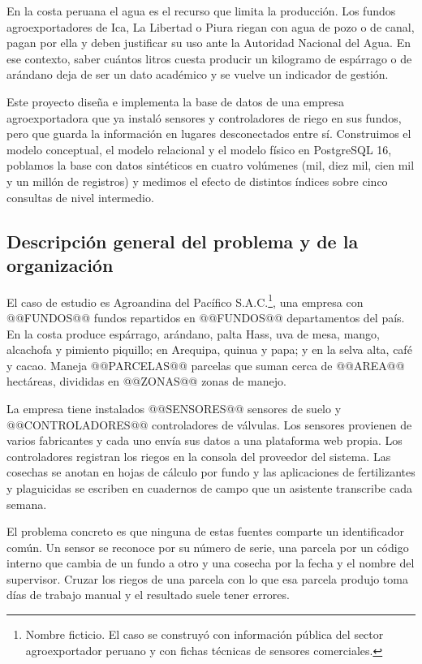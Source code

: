 \documentclass[11pt,letterpaper]{article}
\begin{document}
En la costa peruana el agua es el recurso que limita la producción. Los fundos agroexportadores de Ica, La Libertad o Piura riegan con agua de pozo o de canal, pagan por ella y deben justificar su uso ante la Autoridad Nacional del Agua. En ese contexto, saber cuántos litros cuesta producir un kilogramo de espárrago o de arándano deja de ser un dato académico y se vuelve un indicador de gestión.

Este proyecto diseña e implementa la base de datos de una empresa agroexportadora que ya instaló sensores y controladores de riego en sus fundos, pero que guarda la información en lugares desconectados entre sí. Construimos el modelo conceptual, el modelo relacional y el modelo físico en PostgreSQL 16, poblamos la base con datos sintéticos en cuatro volúmenes (mil, diez mil, cien mil y un millón de registros) y medimos el efecto de distintos índices sobre cinco consultas de nivel intermedio.

\subsection{Descripción general del problema y de la organización}

El caso de estudio es Agroandina del Pacífico S.A.C.\footnote{Nombre ficticio. El caso se construyó con información pública del sector agroexportador peruano y con fichas técnicas de sensores comerciales.}, una empresa con @@FUNDOS@@ fundos repartidos en @@FUNDOS@@ departamentos del país. En la costa produce espárrago, arándano, palta Hass, uva de mesa, mango, alcachofa y pimiento piquillo; en Arequipa, quinua y papa; y en la selva alta, café y cacao. Maneja @@PARCELAS@@ parcelas que suman cerca de @@AREA@@ hectáreas, divididas en @@ZONAS@@ zonas de manejo.

La empresa tiene instalados @@SENSORES@@ sensores de suelo y @@CONTROLADORES@@ controladores de válvulas. Los sensores provienen de varios fabricantes y cada uno envía sus datos a una plataforma web propia. Los controladores registran los riegos en la consola del proveedor del sistema. Las cosechas se anotan en hojas de cálculo por fundo y las aplicaciones de fertilizantes y plaguicidas se escriben en cuadernos de campo que un asistente transcribe cada semana.

El problema concreto es que ninguna de estas fuentes comparte un identificador común. Un sensor se reconoce por su número de serie, una parcela por un código interno que cambia de un fundo a otro y una cosecha por la fecha y el nombre del supervisor. Cruzar los riegos de una parcela con lo que esa parcela produjo toma días de trabajo manual y el resultado suele tener errores.
\end{document}
